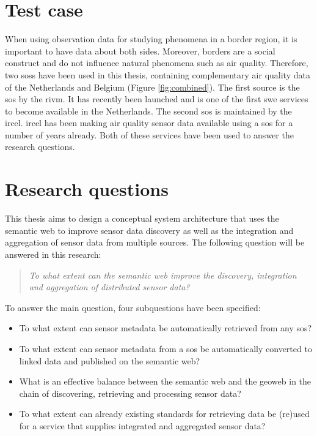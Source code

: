 \section{Test case}
When using observation data for studying phenomena in a border region, it is important to have data about both sides. Moreover, borders are a social construct and do not influence natural phenomena such as air quality. Therefore, two \aclp{sos} have been used in this thesis, containing complementary air quality data of the Netherlands and Belgium (Figure \ref{fig:combined}). The first source is the \ac{sos} by the \ac{rivm}. It has recently been launched and is one of the first \ac{swe} services to become available in the Netherlands. The second \ac{sos} is maintained by the \acf{ircel}. \ac{ircel} has been making air quality sensor data available using a \ac{sos} for a number of years already. Both of these services have been used to answer the research questions.


\section{Research questions}
\label{RQ}
This thesis aims to design a conceptual system architecture that uses the semantic web to improve sensor data discovery as well as the integration and aggregation of sensor data from multiple sources. The following question will be answered in this research:    

\begin{quote}
	\textit{To what extent can the semantic web improve the discovery, integration and aggregation of distributed sensor data?}
\end{quote}

To answer the main question, four subquestions have been specified:
\begin{itemize}
	\item To what extent can sensor metadata be automatically retrieved from any \acl{sos}?
	\item To what extent can sensor metadata from a \acl{sos} be automatically converted to linked data and published on the semantic web?
	\item  What is an effective balance between the semantic web and the geoweb in the chain of discovering, retrieving and processing sensor data?
	\item To what extent can already existing standards for retrieving data be (re)used for a service that supplies integrated and aggregated sensor data?
\end{itemize}

